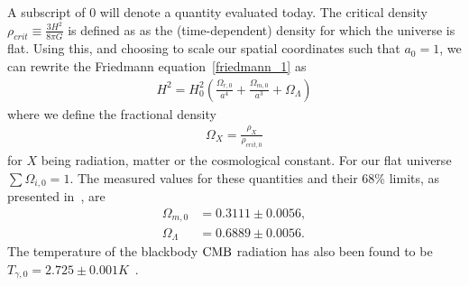     A subscript of $0$ will denote a quantity evaluated today.
    The critical density $\rho_{crit}\equiv\frac{3H^2}{8\pi G}$ is defined as
    as the (time-dependent) density for which the universe is flat.
    Using this,
    and choosing to scale our spatial coordinates such that $a_0=1$,
    we can rewrite the Friedmann equation~\eqref{friedmann_1} as
    \begin{align}\label{friedmann_omega}
        H^2 = H_0^2\left(\frac{\Omega_{r,0}}{a^4}+\frac{\Omega_{m,0}}{a^3}+\Omega_{\Lambda}\right)
    \end{align}
    where we define the fractional density
    \begin{align}
        \Omega_{X} = \frac{\rho_X}{\rho_{crit,0}}
    \end{align}
    for $X$ being radiation, matter or the cosmological constant.
    For our flat universe $\sum\Omega_{i,0}=1$.
    The measured values for these quantities and their $68\%$ limits,
    as presented in~\cite{Planck_parameters_2018}, are
    \begin{align}\label{measured_params}
        \Omega_{m,0} &= 0.3111 \pm 0.0056,\\
        \Omega_{\Lambda} &=  0.6889 \pm 0.0056.
    \end{align}
    The temperature of the blackbody $\text{CMB}$ radiation has also been
    found to be $T_{\gamma,0}=2.725\pm0.001K$~\cite{Fixsen_2009}.


